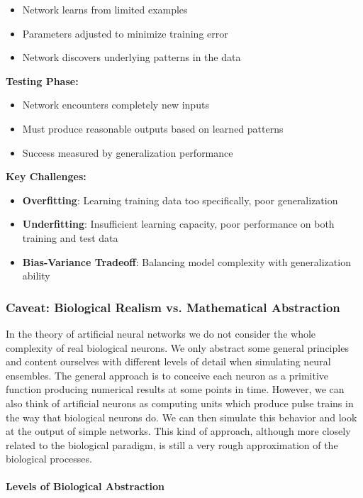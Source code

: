 \begin{itemize}
\item Network learns from limited examples
\item Parameters adjusted to minimize training error
\item Network discovers underlying patterns in the data
\end{itemize}

\textbf{Testing Phase:}

\begin{itemize}
\item Network encounters completely new inputs
\item Must produce reasonable outputs based on learned patterns
\item Success measured by generalization performance
\end{itemize}

\textbf{Key Challenges:}

\begin{itemize}
\item \textbf{Overfitting}: Learning training data too specifically, poor generalization
\item \textbf{Underfitting}: Insufficient learning capacity, poor performance on both training and test data
\item \textbf{Bias-Variance Tradeoff}: Balancing model complexity with generalization ability
\end{itemize}

\subsubsection{Caveat: Biological Realism vs. Mathematical Abstraction}

In the theory of artificial neural networks we do not consider the whole complexity of real biological neurons. We only abstract some general principles and content ourselves with different levels of detail when simulating neural ensembles. The general approach is to conceive each neuron as a primitive function producing numerical results at some points in time. However, we can also think of artificial neurons as computing units which produce pulse trains in the way that biological neurons do. We can then simulate this behavior and look at the output of simple networks. This kind of approach, although more closely related to the biological paradigm, is still a very rough approximation of the biological processes.

\paragraph{Levels of Biological Abstraction}

